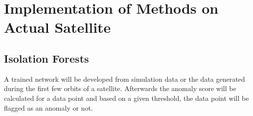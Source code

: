 \chapter{Implementation of Methods on Actual Satellite}
\vspace{-2em}
\minitoc

\section{Isolation Forests}
A trained network will be developed from simulation data or the data generated during the first few orbits of a satellite. Afterwards the anomaly score will be calculated for a data point and based on a given threshold, the data point will be flagged as an anomaly or not.